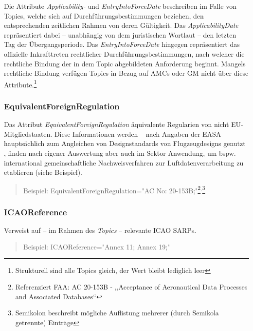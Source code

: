     Die Attribute \textit{Applicability-} und \textit{EntryIntoForceDate} beschreiben im Falle von Topics, welche sich auf Durchführungsbestimmungen beziehen, den entsprechenden zeitlichen Rahmen von deren Gültigkeit.
    Das \textit{ApplicabilityDate} repräsentiert dabei -- unabhängig von dem juristischen Wortlaut -- den letzten Tag der Übergangsperiode. 
    Das \textit{EntryIntoForceDate} hingegen repräsentiert das offizielle Inkrafttreten rechtlicher Durchführungsbestimmungen, nach welcher die rechtliche Bindung der in dem Topic abgebildeten Anforderung beginnt.
    \cite[21]{easa_xml_doc}
    Mangels rechtliche Bindung verfügen Topics in Bezug auf \acsp{AMC} oder \ac{GM} nicht über diese Attribute.\footnote{Strukturell sind alle Topics gleich, der Wert bleibt lediglich leer}
        
\subsubsection{EquivalentForeignRegulation}

    Das Attribut \textit{EquivalentForeignRegulation} äquivalente Regularien von nicht \ac{EU}-Mitgliedstaaten.
    Diese Informationen werden -- nach Angaben der \ac{EASA} -- hauptsächlich zum Angleichen von Designstandards von Flugzeugdesigns genutzt \cite[22]{easa_xml_doc}, finden nach eigener Auswertung aber auch im \atmans{} Sektor Anwendung, um bspw. international gemeinschaftliche Nachweisverfahren zur Luftdatenverarbeitung zu etablieren (siehe Beispiel).
    
    \begin{quote}
        Beispiel:
        \textsf{EquivalentForeignRegulation="{}AC No: 20-153B;"}\footnote{Referenziert \ac{FAA}: \ac{AC} 20-153B - ,,Acceptance of Aeronautical Data Processes and Associated Databases``}$^,$\footnote{Semikolon beschreibt mögliche Auflistung mehrerer (durch Semikola getrennte) Einträge }
    \end{quote}

\subsubsection{ICAOReference}

    Verweist auf -- im Rahmen des \textit{Topics} -- relevante \ac{ICAO} \acp{SARP}. 
    \cite[23]{easa_xml_doc}
    \begin{quote}
        Beispiel:
        \textsf{ICAOReference="{}Annex 11; Annex 19;"}
    \end{quote}
    
